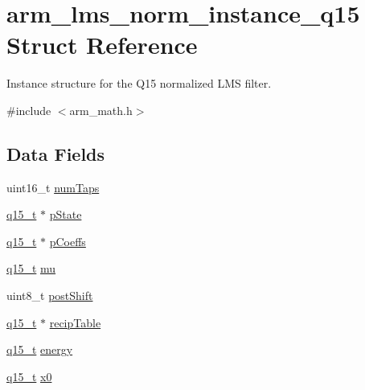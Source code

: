 \hypertarget{structarm__lms__norm__instance__q15}{}\section{arm\+\_\+lms\+\_\+norm\+\_\+instance\+\_\+q15 Struct Reference}
\label{structarm__lms__norm__instance__q15}


Instance structure for the Q15 normalized L\+MS filter.  




{\ttfamily \#include $<$arm\+\_\+math.\+h$>$}

\subsection*{Data Fields}
\begin{DoxyCompactItemize}
\item 
uint16\+\_\+t \hyperlink{structarm__lms__norm__instance__q15_a751941891e47f522a7f5375fe8990aac}{num\+Taps}
\item 
\hyperlink{arm__math_8h_ab5a8fb21a5b3b983d5f54f31614052ea}{q15\+\_\+t} $\ast$ \hyperlink{structarm__lms__norm__instance__q15_ae29dfdb736374fcddaeaec4b7770170c}{p\+State}
\item 
\hyperlink{arm__math_8h_ab5a8fb21a5b3b983d5f54f31614052ea}{q15\+\_\+t} $\ast$ \hyperlink{structarm__lms__norm__instance__q15_a7ca181a37f714d174445f486bebce26f}{p\+Coeffs}
\item 
\hyperlink{arm__math_8h_ab5a8fb21a5b3b983d5f54f31614052ea}{q15\+\_\+t} \hyperlink{structarm__lms__norm__instance__q15_aab4745770bd667de040227eec1b5ff8d}{mu}
\item 
uint8\+\_\+t \hyperlink{structarm__lms__norm__instance__q15_a74050e9f36542bd56f4052381a82ae8f}{post\+Shift}
\item 
\hyperlink{arm__math_8h_ab5a8fb21a5b3b983d5f54f31614052ea}{q15\+\_\+t} $\ast$ \hyperlink{structarm__lms__norm__instance__q15_a39b65b32f68643831304cece01e093bd}{recip\+Table}
\item 
\hyperlink{arm__math_8h_ab5a8fb21a5b3b983d5f54f31614052ea}{q15\+\_\+t} \hyperlink{structarm__lms__norm__instance__q15_ae7a8ccabc82348f6742ca7a2b3da2a41}{energy}
\item 
\hyperlink{arm__math_8h_ab5a8fb21a5b3b983d5f54f31614052ea}{q15\+\_\+t} \hyperlink{structarm__lms__norm__instance__q15_a3c975fed200b19723a2ed11efccca6cd}{x0}
\end{DoxyCompactItemize}


